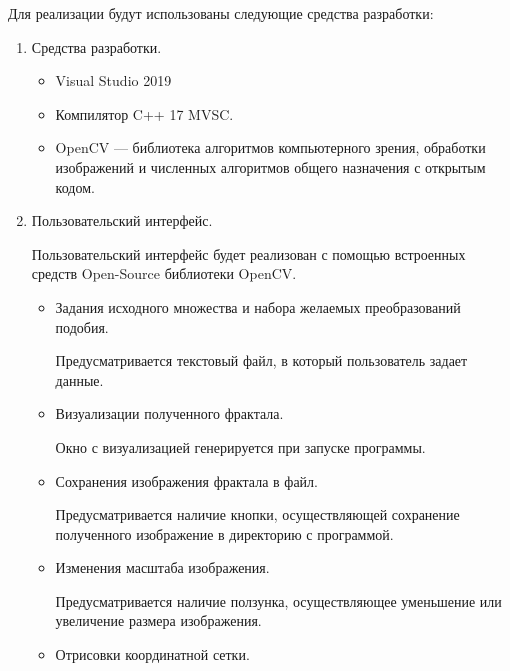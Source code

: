 \documentclass[a4paper,12pt,preview]{report} %
\begin{document}
\begin{enumerate}
		Для реализации будут использованы следующие средства разработки:
		
		\begin{enumerate}
			
			\item Средства разработки.
			 
			\begin{itemize}
				\item Visual Studio 2019 
			
				\item Компилятор C++ 17 MVSC.
			
				\item OpenCV — библиотека алгоритмов компьютерного зрения, обработки изображений и численных алгоритмов общего назначения с открытым кодом.
			
			\end{itemize}
		
			\item Пользовательский интерфейс.
			
			Пользовательский интерфейс будет реализован с помощью встроенных средств Open-Source библиотеки OpenCV.
			
			
			\begin{itemize}
				\item Задания исходного множества и набора желаемых преобразований подобия.
				
				Предусматривается текстовый файл, в который пользователь задает данные. \\
				
				\item Визуализации полученного фрактала.
				
				Окно с визуализацией генерируется при запуске программы. \\
				
				\item Сохранения изображения фрактала в файл.
				
				Предусматривается наличие кнопки, осуществляющей сохранение полученного изображение в директорию с программой. \\
				
				\item Изменения масштаба изображения.
				
				Предусматривается наличие ползунка, осуществляющее уменьшение или увеличение размера изображения. \\
				
				\item Отрисовки координатной сетки.
				

\end{itemize}
\end{enumerate}
\end{enumerate}
\end{document}

